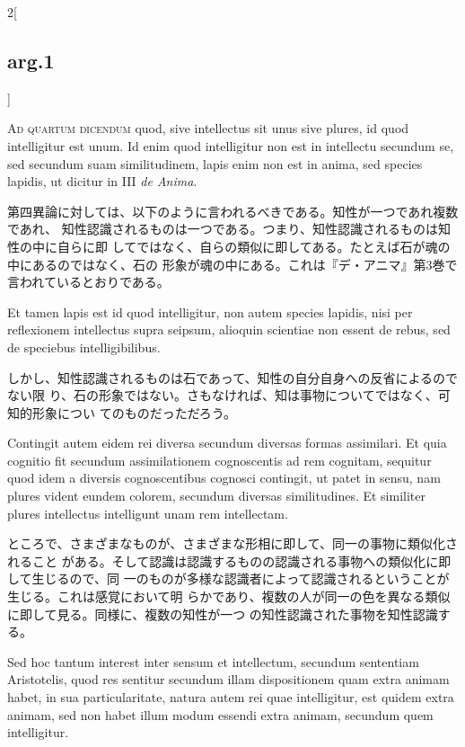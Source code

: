 \documentclass[paper=a4paper,fontsize=10pt,jafontsize=9pt,titlepage]{jlreq}
\begin{document}
\begin{paracol}{2}[\subsection{arg.1}]
\switchcolumn*[\subsection{ad 4}]



 {\scshape Ad quartum dicendum} quod, sive intellectus sit unus sive plures, id
 quod intelligitur est unum. Id enim quod intelligitur non est in intellectu
 secundum se, sed secundum suam similitudinem, lapis enim non est in anima, sed
 species lapidis, ut dicitur in III {\itshape de Anima}.

\switchcolumn

 第四異論に対しては、以下のように言われるべきである。知性が一つであれ複数であれ、
 知性認識されるものは一つである。つまり、知性認識されるものは知性の中に自らに即
 してではなく、自らの類似に即してある。たとえば石が魂の中にあるのではなく、石の
 形象が魂の中にある。これは『デ・アニマ』第3巻で言われているとおりである。
  
\switchcolumn*


 Et tamen lapis est id quod intelligitur, non autem species lapidis, nisi per
 reflexionem intellectus supra seipsum, alioquin scientiae non essent de rebus,
 sed de speciebus intelligibilibus.

 \switchcolumn

 しかし、知性認識されるものは石であって、知性の自分自身への反省によるのでない限
 り、石の形象ではない。さもなければ、知は事物についてではなく、可知的形象につい
 てのものだっただろう。

 \switchcolumn

 Contingit autem eidem rei diversa secundum diversas formas assimilari.  Et quia
 cognitio fit secundum assimilationem cognoscentis ad rem cognitam, sequitur
 quod idem a diversis cognoscentibus cognosci contingit, ut patet in sensu, nam
 plures vident eundem colorem, secundum diversas similitudines. Et similiter
 plures intellectus intelligunt unam rem intellectam.

\switchcolumn

ところで、さまざまなものが、さまざまな形相に即して、同一の事物に類似化されること
がある。そして認識は認識するものの認識される事物への類似化に即して生じるので、同
一のものが多様な認識者によって認識されるということが生じる。これは感覚において明
らかであり、複数の人が同一の色を異なる類似に即して見る。同様に、複数の知性が一つ
の知性認識された事物を知性認識する。
 
\switchcolumn*


 Sed hoc tantum interest inter sensum et intellectum, secundum sententiam
 Aristotelis, quod res sentitur secundum illam dispositionem quam extra animam
 habet, in sua particularitate, natura autem rei quae intelligitur, est quidem
 extra animam, sed non habet illum modum essendi extra animam, secundum quem
 intelligitur.


\end{paracol}
\end{document}
